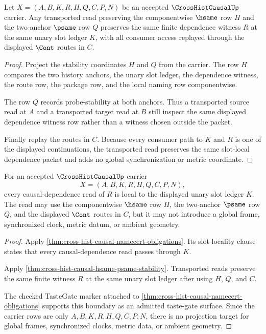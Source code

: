 \begin{theorem}
\label{thm:cross-hist-causal-hsame-psame-stability}
Let $X=(A,B,K,R,H,Q,C,P,N)$ be an accepted $\CrossHistCausalUp$ carrier. Any transported read preserving the componentwise $\hsame$ row $H$ and the two-anchor $\psame$ row $Q$ preserves the same finite dependence witness $R$ at the same unary slot ledger $K$, with all consumer access replayed through the displayed $\Cont$ routes in $C$.
\end{theorem}
\begin{proof}
Project the stability coordinates $H$ and $Q$ from the carrier. The row $H$ compares the two history anchors, the unary slot ledger, the dependence witness, the route row, the package row, and the local naming row componentwise.

The row $Q$ records probe-stability at both anchors. Thus a transported source read at $A$ and a transported target read at $B$ still inspect the same displayed dependence witness row rather than a witness chosen outside the packet.

Finally replay the routes in $C$. Because every consumer path to $K$ and $R$ is one of the displayed continuations, the transported read preserves the same slot-local dependence packet and adds no global synchronization or metric coordinate.
\end{proof}

\begin{theorem}
\label{thm:cross-hist-causal-slot-locality}
For an accepted $\CrossHistCausalUp$ carrier
$$
X=(A,B,K,R,H,Q,C,P,N),
$$
every causal-dependence read of $R$ is local to the displayed unary slot ledger $K$. The read may use the componentwise $\hsame$ row $H$, the two-anchor $\psame$ row $Q$, and the displayed $\Cont$ routes in $C$, but it may not introduce a global frame, synchronized clock, metric datum, or ambient geometry.
\end{theorem}
\begin{proof}
Apply \autoref{thm:cross-hist-causal-namecert-obligations}. Its slot-locality clause states that every causal-dependence read passes through $K$.

Apply \autoref{thm:cross-hist-causal-hsame-psame-stability}. Transported reads preserve the same finite witness $R$ at the same unary slot ledger after using $H$, $Q$, and $C$.

The checked TasteGate marker attached to \autoref{thm:cross-hist-causal-namecert-obligations} supports this boundary as an admitted taste-gate surface. Since the carrier rows are only $A,B,K,R,H,Q,C,P,N$, there is no projection target for global frames, synchronized clocks, metric data, or ambient geometry.
\end{proof}

